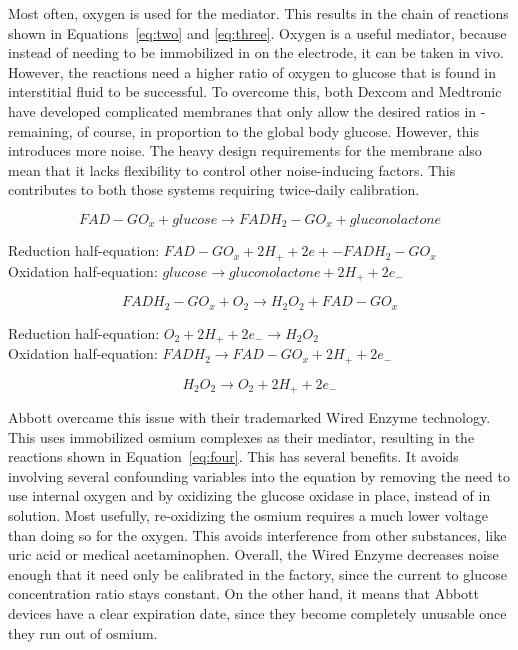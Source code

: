 Most often, oxygen is used for the mediator. This results in the chain of reactions shown in Equations~\ref{eq:two} and \ref{eq:three}. Oxygen is a useful mediator, because instead of needing to be immobilized in on the electrode, it can be taken in vivo. However, the reactions need a higher ratio of oxygen to glucose that is found in interstitial fluid to be successful. To overcome this, both Dexcom and Medtronic have developed complicated membranes that only allow the desired ratios in - remaining, of course, in proportion to the global body glucose\cite{noauthor_mary_nodate}. However, this introduces more noise. The heavy design requirements for the membrane also mean that it lacks flexibility to control other noise-inducing factors. This contributes to both those systems requiring twice-daily calibration.

\begin{equation} \label{eq:one}
FAD-GO_x + glucose \rightarrow FADH_2-GO_x + gluconolactone
\end{equation}

Reduction half-equation: $FAD-GO_x + 2H_+ + 2e+-  FADH_2-GO_x$\\ 
Oxidation half-equation: $glucose \rightarrow gluconolactone + 2H_+ + 2e_- $

\begin{equation} \label{eq:two}
FADH_2 - GO_x + O_2 \rightarrow H_2O_2 + FAD-GO_x 
\end{equation}

Reduction half-equation: $O_2 + 2H_+ + 2e_- \rightarrow H_2O_2$ \\
Oxidation half-equation: $FADH_2 \rightarrow FAD-GO_x + 2H_+ + 2e_-$ 

\begin{equation} \label{eq:three}
 H_2O_2 \rightarrow O_2 + 2H_+ + 2e_- 
\end{equation}

Abbott overcame this issue with their trademarked Wired Enzyme technology\cite{noauthor_sensor_nodate}. This uses immobilized osmium complexes as their mediator, resulting in the reactions shown in Equation~\ref{eq:four}. This has several benefits. It avoids involving several confounding variables into the equation by removing the need to use internal oxygen and by oxidizing the glucose oxidase in place, instead of in solution. Most usefully, re-oxidizing the osmium requires a much lower voltage than doing so for the oxygen. This avoids interference from other substances, like uric acid or medical acetaminophen\cite{noauthor_mary_nodate}. Overall, the Wired Enzyme decreases noise enough that it need only be calibrated in the factory, since the current to glucose concentration ratio stays constant\cite{hoss_feasibility_2014}. On the other hand, it means that Abbott devices have a clear expiration date, since they become completely unusable once they run out of osmium.

